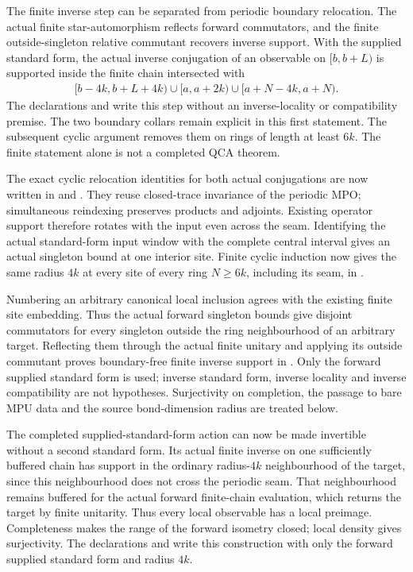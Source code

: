 \documentclass[11pt]{article}
\begin{document}
The finite inverse step can be separated from periodic boundary
relocation. The actual finite star-automorphism reflects forward
commutators, and the finite outside-singleton relative commutant recovers
inverse support. With the supplied standard form, the actual inverse
conjugation of an observable on $[b,b+L)$ is supported inside the finite
chain intersected with
\begin{align}
    [b-4k,b+L+4k)\cup[a,a+2k)\cup[a+N-4k,a+N).
    \label{eq:mpu_qca_complete_block_heisenberg_scope_1}
\end{align}
The declarations
 and
write this step without an inverse-locality or compatibility premise.
The two boundary collars remain explicit in this first statement.
The subsequent cyclic argument removes them on rings of length at least
$6k$. The finite statement alone is not a completed QCA theorem.

The exact cyclic relocation identities for both actual conjugations
are now written in
 and
.
They reuse closed-trace invariance of the periodic MPO; simultaneous
reindexing preserves products and adjoints. Existing operator support
therefore rotates with the input even across the seam. Identifying the
actual standard-form input window with the complete central interval
gives an actual singleton bound at one interior site. Finite cyclic
induction now gives the same radius $4k$ at every site of every ring
$N\geq 6k$, including its seam, in
.

Numbering an arbitrary canonical local inclusion agrees with the
existing finite site embedding. Thus the actual forward singleton
bounds give disjoint commutators for every singleton outside the ring
neighbourhood of an arbitrary target. Reflecting them through the actual
finite unitary and applying its outside commutant proves boundary-free
finite inverse support in
.
Only the forward supplied standard form is used; inverse standard form,
inverse locality and inverse compatibility are not hypotheses.
Surjectivity on completion, the passage to bare MPU data and the source
bond-dimension radius are treated below.


The completed supplied-standard-form action can now be made invertible
without a second standard form. Its actual finite inverse on one
sufficiently buffered chain has support in the ordinary radius-$4k$
neighbourhood of the target, since this neighbourhood does not cross
the periodic seam. That neighbourhood remains buffered for the actual
forward finite-chain evaluation, which returns the target by finite
unitarity. Thus every local observable has a local preimage. Completeness
makes the range of the forward isometry closed; local density gives
surjectivity. The declarations
 and
 write this construction
with only the forward supplied standard form and radius $4k$.
\end{document}
